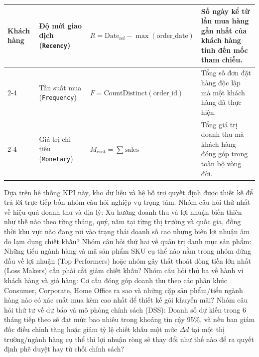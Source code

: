 \begin{table}[H]
\begin{tabularx}{\textwidth}{|l|l|l|X|}
\hline
\multirow{3}{*}{Khách hàng} 
 & Độ mới giao dịch (\texttt{Recency}) & $R = \text{Date}_{\text{ref}} - \max(\text{order\_date})$ & Số ngày kể từ lần mua hàng gần nhất của khách hàng tính đến mốc tham chiếu. \\ \cline{2-4}
 & Tần suất mua (\texttt{Frequency}) & $F = \text{CountDistinct}(\text{order\_id})$ & Tổng số đơn đặt hàng độc lập mà một khách hàng đã thực hiện. \\ \cline{2-4}
 & Giá trị chi tiêu (\texttt{Monetary}) & $M_{\text{cust}} = \sum \text{sales}$ & Tổng giá trị doanh thu mà khách hàng đóng góp trong toàn bộ vòng đời. \\
\hline
\end{tabularx}
\end{table}

Dựa trên hệ thống KPI này, kho dữ liệu và hệ hỗ trợ quyết định được thiết kế để trả lời trực tiếp bốn nhóm câu hỏi nghiệp vụ trọng tâm. Nhóm câu hỏi thứ nhất về hiệu quả doanh thu và địa lý: Xu hướng doanh thu và lợi nhuận biến thiên như thế nào theo từng tháng, quý, năm tại từng thị trường và quốc gia, đồng thời khu vực nào đang rơi vào trạng thái doanh số cao nhưng biên lợi nhuận âm do lạm dụng chiết khấu? Nhóm câu hỏi thứ hai về quản trị danh mục sản phẩm: Những tiểu ngành hàng và mã sản phẩm SKU cụ thể nào nằm trong nhóm đứng đầu về lợi nhuận (Top Performers) hoặc nhóm gây thất thoát dòng tiền lớn nhất (Loss Makers) cần phải cắt giảm chiết khấu? Nhóm câu hỏi thứ ba về hành vi khách hàng và giỏ hàng: Cơ cấu đóng góp doanh thu theo các phân khúc Consumer, Corporate, Home Office ra sao và những cặp sản phẩm/tiểu ngành hàng nào có xác suất mua kèm cao nhất để thiết kế gói khuyến mãi? Nhóm câu hỏi thứ tư về dự báo và mô phỏng chính sách (DSS): Doanh số dự kiến trong 6 tháng tiếp theo sẽ đạt mức bao nhiêu trong khoảng tin cậy 95\%, và nếu ban giám đốc điều chỉnh tăng hoặc giảm tỷ lệ chiết khấu một mức $\Delta d$ tại một thị trường/ngành hàng cụ thể thì lợi nhuận ròng sẽ thay đổi như thế nào để ra quyết định phê duyệt hay từ chối chính sách?
